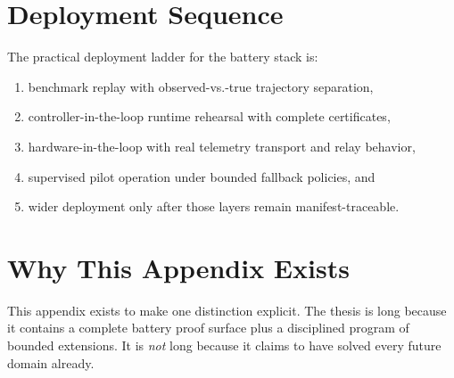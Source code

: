 \section{Deployment Sequence}

The practical deployment ladder for the battery stack is:

\begin{enumerate}
  \item benchmark replay with observed-vs.-true trajectory separation,
  \item controller-in-the-loop runtime rehearsal with complete
    certificates,
  \item hardware-in-the-loop with real telemetry transport and relay
    behavior,
  \item supervised pilot operation under bounded fallback policies, and
  \item wider deployment only after those layers remain manifest-traceable.
\end{enumerate}

\section{Why This Appendix Exists}

This appendix exists to make one distinction explicit.  The thesis is long
because it contains a complete battery proof surface plus a disciplined
program of bounded extensions.  It is \emph{not} long because it claims to
have solved every future domain already.
